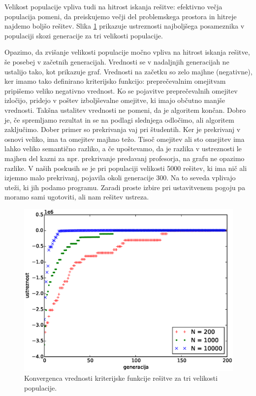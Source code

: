 \documentclass[a4paper,12pt]{book}
\begin{document}
Velikost populacije vpliva tudi na hitrost iskanja rešitve: efektivno večja populacija pomeni, da preiskujemo večji del problemskega prostora in hitreje najdemo boljšo rešitev. Slika \ref{pic:generation-fitness-multiple} prikazuje ustreznosti najboljšega posameznika v populaciji skozi generacije za tri velikosti populacije. 

Opazimo, da zvišanje velikosti populacije močno vpliva na hitrost iskanja rešitve, še posebej v začetnih generacijah. Vrednosti se v nadaljnjih generacijah ne ustalijo tako, kot prikazuje graf. Vrednosti na začetku so zelo majhne (negativne), ker imamo tako definirano kriterijsko funkcijo: preprečevalnim omejitvam pripišemo veliko negativno vrednost. Ko se pojavitve preprečevalnih omejitev izločijo, pridejo v poštev izboljševalne omejitve, ki imajo občutno manjše vrednosti. Takšna ustalitev vrednosti ne pomeni, da je algoritem končan. Dobro je, če spremljamo rezultat in se na podlagi slednjega odločimo, ali algoritem zaključimo. Dober primer so prekrivanja vaj pri študentih. Ker je prekrivanj v osnovi veliko, ima ta omejitev majhno težo. Tisoč omejitev ali sto omejitev ima lahko veliko semantično razliko, a če upoštevamo, da je razlika v ustreznosti le majhen del kazni za npr. prekrivanje predavanj profesorja, na grafu ne opazimo razlike. V naših poskusih se je pri populaciji velikosti 5000 rešitev, ki ima nič ali izjemno malo prekrivanj, pojavila okoli generacije 300. Na to seveda vplivajo uteži, ki jih podamo programu. Zaradi proste izbire pri ustavitvenem pogoju pa moramo sami ugotoviti, ali nam rešitev ustreza. 

\begin{figure}
	\centering
	\includegraphics[scale=0.6]{res/generation-fitness-multiple.eps}
	\caption{Konvergenca vrednosti kriterijske funkcije rešitve za tri velikosti populacije. }
	\label{pic:generation-fitness-multiple}
\end{figure}
\end{document}
